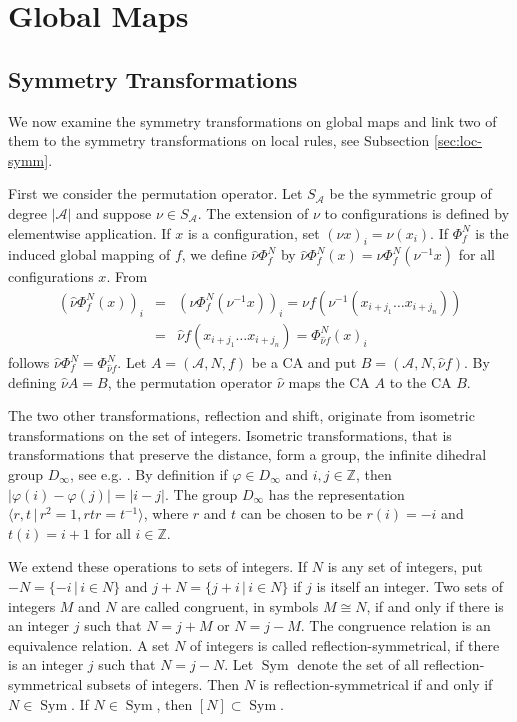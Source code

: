 \documentclass[11pt,a4paper]{article}
\newcommand{\Sym}{\mathop{\mathrm{Sym}}}
\begin{document}
\section{Global Maps}
\label{sec:glob}

\subsection{Symmetry Transformations}
We now examine the symmetry transformations on global maps and link two of them to the
symmetry transformations on local rules, see  Subsection \ref{sec:loc-symm}.

First we consider the permutation operator.
Let $S_\mathcal{A}$ be the symmetric group of degree $|\mathcal{A}|$
and suppose $\nu \in S_\mathcal{A}$.
The extension of $\nu$ to configurations is defined by elementwise application.
If $x$ is a configuration, set $(\nu x)_i = \nu (x_i)$.
If $\Phi^N_f$ is the induced global mapping of $f$, we define
$\hat{\nu} \Phi^N_f$ by
$\hat{\nu} \Phi^N_f (x) = \nu \Phi^N_f (\nu^{-1} x)$ for all configurations $x$.
From
\begin{eqnarray*}
\left( \hat{\nu} \Phi^N_f(x) \right)_{i}
& = & \left( \nu \Phi^N_f (\nu^{-1} x) \right)_{i}
= \nu f \left(\nu^{-1}(x_{i+j_1} \ldots x_{i+j_{n}}) \right) \\
& = & \hat{\nu} f(x_{i+j_1} \ldots x_{i+j_{n}})
 =  \Phi^N_{\hat{\nu} f} (x)_{i}
\end{eqnarray*}
follows $\hat{\nu} \Phi^N_f =  \Phi^N_{\hat{\nu} f}$.
Let $A = (\mathcal{A}, N, f)$ be a CA and put $B = (\mathcal{A}, N, \hat{\nu} f)$.
By defining $\hat{\nu} A = B$, the permutation operator $\hat{\nu}$ maps the CA $A$ to the CA $B$.

The two other transformations, reflection and shift, originate from isometric transformations on the set of integers.
Isometric transformations, that is transformations that preserve the distance, form a group,
the infinite dihedral group $D_\infty$, see e.g. \cite{armstrong1997groups}.
By definition if $\varphi \in D_\infty$ and $i,j \in \mathbb{Z}$,
then $|\varphi(i) - \varphi(j)| = |i - j|$.
The group $D_\infty$ has the representation $\langle r, t \, | \, r^2=1, rtr = t^{-1} \rangle$,
where $r$ and $t$ can be chosen to be $r(i) = -i$ and $t(i) = i+1$ for all $i \in \mathbb{Z}$.

We extend these operations to sets of integers.
If $N$ is any set of integers, put $-N = \{-i \, | \, i \in N \}$ and
$j + N = \{ j + i \, | \, i \in N \}$ if $j$ is itself an integer.
Two sets of integers $M$ and $N$ are called congruent, in symbols $M \cong N$,  if and only if
there is an integer $j$ such that $N = j + M $ or $N = j - M$.
The congruence relation is an equivalence relation.
A set $N$ of integers is called reflection-symmetrical, if
there is an integer $j$ such that $N = j - N$.
Let $\Sym$ denote the set of all reflection-symmetrical subsets of integers.
Then $N$ is reflection-symmetrical if and only if $N \in \Sym$.
If $N \in \Sym$, then $[N] \subset \Sym$.
\end{document}
